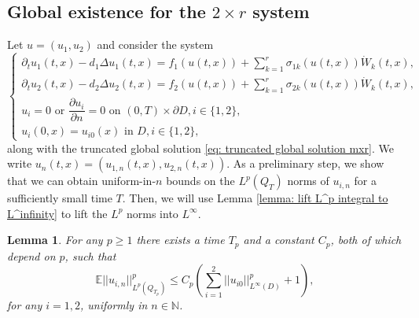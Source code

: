 \documentclass[12pt]{article}
\newtheorem{lemma}{Lemma}
\theoremstyle{definition}
\theoremstyle{remark}
\begin{document}
\subsection{Global existence for the $2\times r$ system}
Let $u = (u_1,u_2)$ and consider the system
\begin{equation}\label{eq: 2xr system}
\begin{cases}
    \partial_t u_1(t,x) - d_1\Delta u_1(t,x) = f_1(u(t,x)) + \sum\limits_{k=1}^r \sigma_{1k}(u(t,x))\dot{W}_k(t,x),\\
    \partial_t u_2(t,x) - d_2\Delta u_2(t,x) = f_2(u(t,x)) + \sum\limits_{k=1}^r \sigma_{2k}(u(t,x))\dot{W}_k(t,x),\\
    u_i = 0 \text{ or } \dfrac{\partial u_i}{\partial n} = 0 \text{ on } (0,T)\times \partial D, i\in \{1,2\},\\
    u_i(0,x) = u_{i0}(x) \text{ in }  D, i\in \{1,2\},
\end{cases}
\end{equation}
along with the truncated global solution \eqref{eq: truncated global solution mxr}. We write $u_n(t,x) = (u_{1,n}(t,x),u_{2,n}(t,x))$. As a preliminary step, we show that we can obtain uniform-in-$n$ bounds on the $L^p(Q_T)$ norms of $u_{i,n}$ for a sufficiently small time $T$. Then, we will use Lemma \ref{lemma: lift L^p integral to L^infinity} to lift the $L^p$ norms into $L^{\infty}$.
\begin{lemma}\label{lemma: For every p there exists a T_p, C_p such that bound for small times}
For any $p\geq 1$ there exists a time $T_p$ and a constant $C_p$, both of which depend on $p$, such that
\[
\mathbb E||u_{i,n}||^p_{L^p(Q_{T_p})}\leq C_{p}\left(\sum_{i=1}^2 ||u_{i0}||^p_{L^{\infty}(D)}+1\right),
\]
for any $i=1,2$, uniformly in $n\in \mathbb N$.
\end{lemma}
\end{document}
